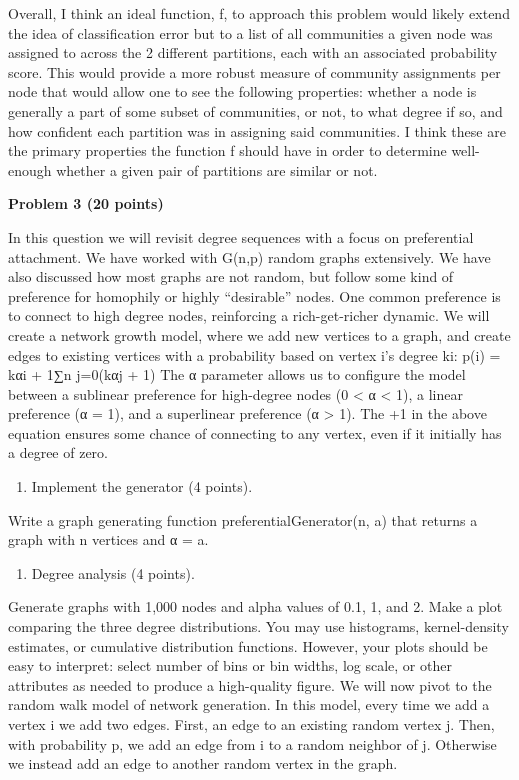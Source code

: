 \documentclass[11pt]{article}
\providecommand{\tightlist}{%
      \setlength{\itemsep}{0pt}\setlength{\parskip}{0pt}}
\begin{document}
Overall, I think an ideal function, f, to approach this problem would
likely extend the idea of classification error but to a list of all
communities a given node was assigned to across the 2 different
partitions, each with an associated probability score. This would
provide a more robust measure of community assignments per node that
would allow one to see the following properties: whether a node is
generally a part of some subset of communities, or not, to what degree
if so, and how confident each partition was in assigning said
communities. I think these are the primary properties the function f
should have in order to determine well-enough whether a given pair of
partitions are similar or not.

\begin{problemstmt}
    \textbf{Problem 3 (20 points)}

In this question we will revisit degree sequences with a focus on
preferential attachment. We have worked with G(n,p) random graphs
extensively. We have also discussed how most graphs are not random, but
follow some kind of preference for homophily or highly ``desirable''
nodes. One common preference is to connect to high degree nodes,
reinforcing a rich-get-richer dynamic. We will create a network growth
model, where we add new vertices to a graph, and create edges to
existing vertices with a probability based on vertex i's degree ki: p(i)
= kαi + 1∑︁n j=0(kαj + 1) The α parameter allows us to configure the
model between a sublinear preference for high-degree nodes (0
\textless{} α \textless{} 1), a linear preference (α = 1), and a
superlinear preference (α \textgreater{} 1). The +1 in the above
equation ensures some chance of connecting to any vertex, even if it
initially has a degree of zero.

\begin{enumerate}
\def\labelenumi{(\roman{enumi})}
\tightlist
\item
  Implement the generator (4 points).
\end{enumerate}

Write a graph generating function preferentialGenerator(n, a) that
returns a graph with n vertices and α = a.

\begin{enumerate}
\def\labelenumi{(\roman{enumi})}
\setcounter{enumi}{1}
\tightlist
\item
  Degree analysis (4 points).
\end{enumerate}

Generate graphs with 1,000 nodes and alpha values of 0.1, 1, and 2. Make
a plot comparing the three degree distributions. You may use histograms,
kernel-density estimates, or cumulative distribution functions. However,
your plots should be easy to interpret: select number of bins or bin
widths, log scale, or other attributes as needed to produce a
high-quality figure. We will now pivot to the random walk model of
network generation. In this model, every time we add a vertex i we add
two edges. First, an edge to an existing random vertex j. Then, with
probability p, we add an edge from i to a random neighbor of j.
Otherwise we instead add an edge to another random vertex in the graph.


\end{problemstmt}
\end{document}
